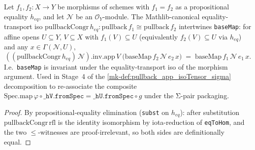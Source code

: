\begin{lemma}
  \label{mk-lem:baseMap_pullbackCongr_apply}
  \leanok

  Let \(f_1, f_2 : X \to Y\) be morphisms of schemes with
  \(f_1 = f_2\) as a propositional equality \(h_{eq}\), and let
  \(\mathcal N\) be an \(\mathcal O_Y\)-module. The Mathlib-canonical
  equality-transport iso
  \(\text{pullbackCongr}\,h_{eq} : \text{pullback}\,f_1
    \cong \text{pullback}\,f_2\)
  intertwines \texttt{baseMap}: for affine opens \(U \subseteq Y\),
  \(V \subseteq X\) with \(f_1(V) \subseteq U\) (equivalently
  \(f_2(V) \subseteq U\) via \(h_{eq}\)) and any
  \(x \in \Gamma(\mathcal N, U)\),
  \[
    ((\text{pullbackCongr}\,h_{eq})\,\mathcal N).\mathrm{inv}.\mathrm{app}\,V\;
    \bigl(\text{baseMap}\,f_2\,\mathcal N\,e_2\,x\bigr)
    \;=\;
    \text{baseMap}\,f_1\,\mathcal N\,e_1\,x.
  \]
  I.e.\ \texttt{baseMap} is invariant under the equality-transport iso
  of the morphism argument. Used in Stage~4 of the
  \ref{mk-def:pullback_app_isoTensor_sigma} decomposition to re-associate
  the composite
  \(\text{Spec.map}\,\varphi \circ \mathtt{\_hV.fromSpec}
    = \mathtt{\_hU.fromSpec} \circ g\) under the Σ-pair packaging.
\end{lemma}
\begin{proof}
  \leanok
  By propositional-equality elimination (\texttt{subst} on
  \(h_{eq}\)): after substitution \(\text{pullbackCongr}\,\mathrm{rfl}\)
  is the identity isomorphism by iota-reduction of \texttt{eqToHom},
  and the two \(\le\)-witnesses are proof-irrelevant, so both sides
  are definitionally equal.
\end{proof}

